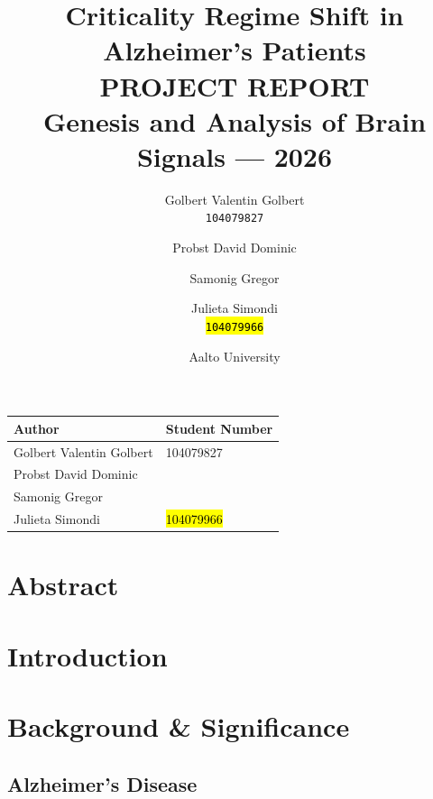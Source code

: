 \documentclass[12pt,a4paper]{article}
\title{\textbf{Criticality Regime Shift in Alzheimer's Patients}\\[0.5em]
  \large PROJECT REPORT\\
  \normalsize Genesis and Analysis of Brain Signals --- 2026}
\author{
  Golbert Valentin Golbert \\ \texttt{104079827}
  \and
  Probst David Dominic
  \and
  Samonig Gregor
  \and
  Julieta Simondi \\ \texttt{\hl{104079966}}
}
\date{Aalto University}
\begin{document}
\maketitle

\begin{center}
\end{center}

\begin{table}[H]
  \centering
  \begin{tabular}{@{}p{} p{}@{}}
    \toprule
    \textbf{Author} & \textbf{Student Number} \\
    \midrule
    Golbert Valentin Golbert & 104079827 \\
    Probst David Dominic     &            \\
    Samonig Gregor           &            \\
    Julieta Simondi          & \hl{104079966} \\
    \bottomrule
  \end{tabular}
\end{table}

\section*{Abstract}


\section{Introduction}


\section{Background \& Significance}

\subsection{Alzheimer's Disease}
\end{document}
